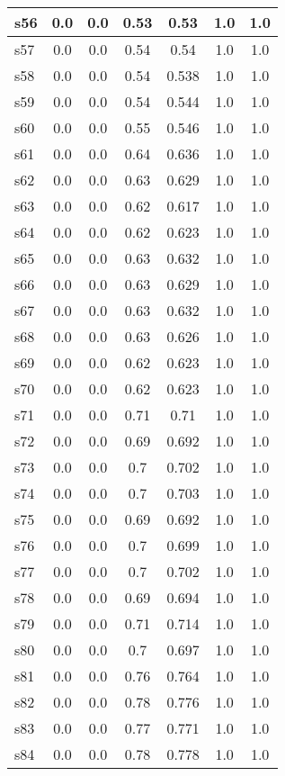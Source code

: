 \documentclass{article}
\begin{document}
\begin{tabular}{|l|c|c|c|c|c|c|}
\hline
s56 &0.0 & 0.0 & 0.53 & 0.53 & 1.0 & 1.0\\
\hline
s57 &0.0 & 0.0 & 0.54 & 0.54 & 1.0 & 1.0\\
\hline
s58 &0.0 & 0.0 & 0.54 & 0.538 & 1.0 & 1.0\\
\hline
s59 &0.0 & 0.0 & 0.54 & 0.544 & 1.0 & 1.0\\
\hline
s60 &0.0 & 0.0 & 0.55 & 0.546 & 1.0 & 1.0\\
\hline
s61 &0.0 & 0.0 & 0.64 & 0.636 & 1.0 & 1.0\\
\hline
s62 &0.0 & 0.0 & 0.63 & 0.629 & 1.0 & 1.0\\
\hline
s63 &0.0 & 0.0 & 0.62 & 0.617 & 1.0 & 1.0\\
\hline
s64 &0.0 & 0.0 & 0.62 & 0.623 & 1.0 & 1.0\\
\hline
s65 &0.0 & 0.0 & 0.63 & 0.632 & 1.0 & 1.0\\
\hline
s66 &0.0 & 0.0 & 0.63 & 0.629 & 1.0 & 1.0\\
\hline
s67 &0.0 & 0.0 & 0.63 & 0.632 & 1.0 & 1.0\\
\hline
s68 &0.0 & 0.0 & 0.63 & 0.626 & 1.0 & 1.0\\
\hline
s69 &0.0 & 0.0 & 0.62 & 0.623 & 1.0 & 1.0\\
\hline
s70 &0.0 & 0.0 & 0.62 & 0.623 & 1.0 & 1.0\\
\hline
s71 &0.0 & 0.0 & 0.71 & 0.71 & 1.0 & 1.0\\
\hline
s72 &0.0 & 0.0 & 0.69 & 0.692 & 1.0 & 1.0\\
\hline
s73 &0.0 & 0.0 & 0.7 & 0.702 & 1.0 & 1.0\\
\hline
s74 &0.0 & 0.0 & 0.7 & 0.703 & 1.0 & 1.0\\
\hline
s75 &0.0 & 0.0 & 0.69 & 0.692 & 1.0 & 1.0\\
\hline
s76 &0.0 & 0.0 & 0.7 & 0.699 & 1.0 & 1.0\\
\hline
s77 &0.0 & 0.0 & 0.7 & 0.702 & 1.0 & 1.0\\
\hline
s78 &0.0 & 0.0 & 0.69 & 0.694 & 1.0 & 1.0\\
\hline
s79 &0.0 & 0.0 & 0.71 & 0.714 & 1.0 & 1.0\\
\hline
s80 &0.0 & 0.0 & 0.7 & 0.697 & 1.0 & 1.0\\
\hline
s81 &0.0 & 0.0 & 0.76 & 0.764 & 1.0 & 1.0\\
\hline
s82 &0.0 & 0.0 & 0.78 & 0.776 & 1.0 & 1.0\\
\hline
s83 &0.0 & 0.0 & 0.77 & 0.771 & 1.0 & 1.0\\
\hline
s84 &0.0 & 0.0 & 0.78 & 0.778 & 1.0 & 1.0\\

\end{tabular}
\end{document}
